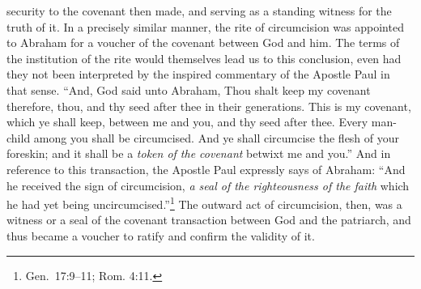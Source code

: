 \documentclass[english,]{book}
\begin{document}
security to the covenant then made, and serving as a standing witness for the truth of it. In a precisely similar manner, the rite of circumcision was appointed to Abraham for a voucher of the covenant between God and him. The terms of the institution of the rite would themselves lead us to this conclusion, even had they not been interpreted by the inspired commentary of the Apostle Paul in that sense. ``And, God said unto Abraham, Thou shalt keep my covenant therefore, thou, and thy seed after thee in their generations. This is my covenant, which ye shall keep, between me and you, and thy seed after thee. Every man-child among you shall be circumcised. And ye shall circumcise the flesh of your foreskin; and it shall be a \emph{token of the covenant} betwixt me and you.'' And in reference to this transaction, the Apostle Paul expressly says of Abraham: ``And he received the sign of circumcision, \emph{a seal of the righteousness of the faith} which he had yet being uncircumcised.''\footnote{Gen.~17:9--11; Rom. 4:11.} The outward act of circumcision, then, was a witness or a seal of the covenant transaction between God and the patriarch, and thus became a voucher to ratify and confirm the validity of it.
\end{document}
